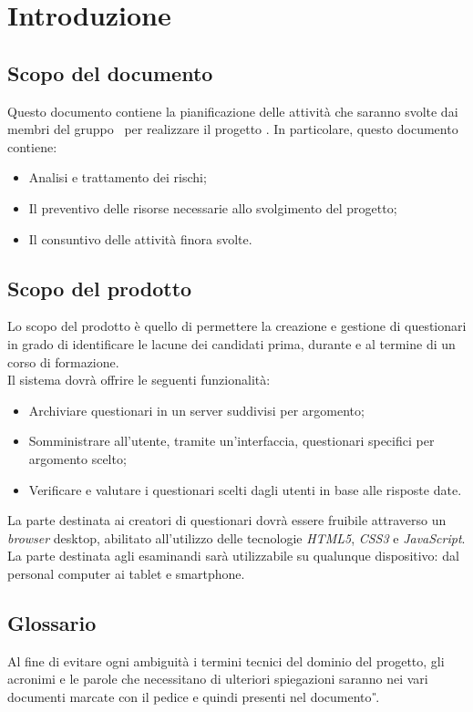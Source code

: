 \newpage
\section{Introduzione}
\subsection{Scopo del documento}
Questo documento contiene la pianificazione delle attività che saranno svolte dai membri del gruppo \gruppo\ per realizzare il progetto \progetto. In particolare, questo documento contiene:

	\begin{itemize}
		\item Analisi e trattamento dei rischi;
		\item Il preventivo delle risorse necessarie allo svolgimento del progetto;
		\item Il consuntivo delle attività finora svolte.
	\end{itemize}
	
\subsection{Scopo del prodotto}
Lo scopo del prodotto è quello di permettere la creazione e gestione di questionari in grado di identificare le lacune dei candidati prima, durante e al termine di un corso di formazione. 
\\Il sistema dovrà offrire le seguenti funzionalità:
\begin{itemize}
	\item
	Archiviare questionari in un server suddivisi per argomento;
	\item
	Somministrare all'utente, tramite un'interfaccia, questionari specifici per argomento scelto;
	\item
	Verificare e valutare i questionari scelti dagli utenti in base alle risposte date.
\end{itemize}
La parte destinata ai creatori di questionari dovrà essere fruibile attraverso un \textit{browser} desktop, abilitato all'utilizzo delle tecnologie \textit{HTML5}, \textit{CSS3} e \textit{JavaScript}. La parte destinata agli esaminandi sarà utilizzabile su qualunque dispositivo: dal personal computer ai tablet e smartphone.

\subsection{Glossario}
Al fine di evitare ogni ambiguità i termini tecnici del dominio del progetto, gli acronimi e le parole che necessitano di ulteriori spiegazioni saranno nei vari documenti marcate con il pedice  e quindi presenti nel documento \textit{\G}.
